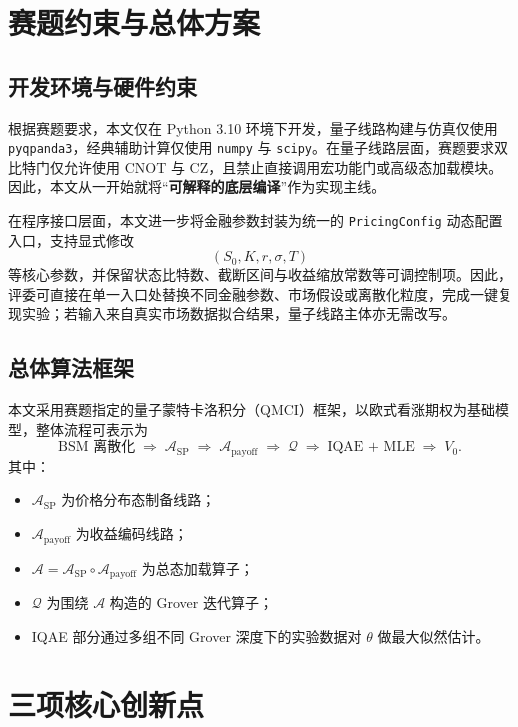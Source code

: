 \documentclass[12pt,a4paper]{ctexart}
\begin{document}
\section{赛题约束与总体方案}
\subsection{开发环境与硬件约束}
根据赛题要求，本文仅在 Python 3.10 环境下开发，量子线路构建与仿真仅使用 \texttt{pyqpanda3}，经典辅助计算仅使用 \texttt{numpy} 与 \texttt{scipy}。在量子线路层面，赛题要求双比特门仅允许使用 CNOT 与 CZ，且禁止直接调用宏功能门或高级态加载模块。因此，本文从一开始就将“\textbf{可解释的底层编译}”作为实现主线。

在程序接口层面，本文进一步将金融参数封装为统一的 \texttt{PricingConfig} 动态配置入口，支持显式修改
\begin{equation}
(S_0,K,r,\sigma,T)
\end{equation}
等核心参数，并保留状态比特数、截断区间与收益缩放常数等可调控制项。因此，评委可直接在单一入口处替换不同金融参数、市场假设或离散化粒度，完成一键复现实验；若输入来自真实市场数据拟合结果，量子线路主体亦无需改写。

\subsection{总体算法框架}
本文采用赛题指定的量子蒙特卡洛积分（QMCI）框架，以欧式看涨期权为基础模型，整体流程可表示为
\begin{equation}
\text{BSM 离散化}
\;\Longrightarrow\;
\mathcal{A}_{\mathrm{SP}}
\;\Longrightarrow\;
\mathcal{A}_{\mathrm{payoff}}
\;\Longrightarrow\;
\mathcal{Q}
\;\Longrightarrow\;
\text{IQAE + MLE}
\;\Longrightarrow\;
V_0.
\end{equation}
其中：
\begin{itemize}[leftmargin=2em]
\item $\mathcal{A}_{\mathrm{SP}}$ 为价格分布态制备线路；
\item $\mathcal{A}_{\mathrm{payoff}}$ 为收益编码线路；
\item $\mathcal{A}=\mathcal{A}_{\mathrm{SP}}\circ\mathcal{A}_{\mathrm{payoff}}$ 为总态加载算子；
\item $\mathcal{Q}$ 为围绕 $\mathcal{A}$ 构造的 Grover 迭代算子；
\item IQAE 部分通过多组不同 Grover 深度下的实验数据对 $\theta$ 做最大似然估计。
\end{itemize}

\section{三项核心创新点}
\end{document}
